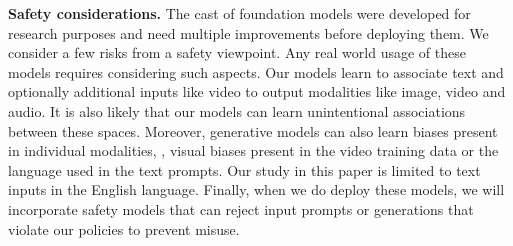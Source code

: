 \par \noindent \textbf{Safety considerations.}
The \OURS cast of foundation models were developed for research purposes and need multiple improvements before deploying them.
We consider a few risks from a safety viewpoint.
Any real world usage of these models requires considering such aspects.
Our models learn to associate text and optionally additional inputs like video to output modalities like image, video and audio.
It is also likely that our models can learn unintentional associations between these spaces.
Moreover, generative models can also learn biases present in individual modalities, \eg, visual biases present in the video training data or the language used in the text prompts.
Our study in this paper is limited to text inputs in the English language.
Finally, when we do deploy these models, we will incorporate safety models that can reject input prompts or generations that violate our policies to prevent misuse.

